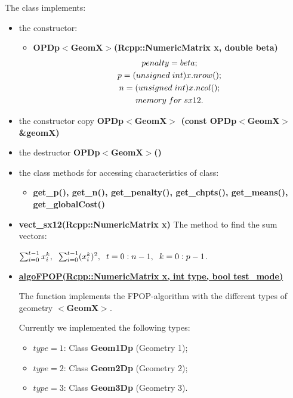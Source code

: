 \documentclass{report}
\begin{document}
	The class implements:
	\begin{itemize}	
		\item the constructor:
		\begin{itemize}
			\item {\bfseries OPDp$<$GeomX$>$(Rcpp::NumericMatrix x, double beta)}
			\begin{equation*}
				\begin{gathered}
					penalty = beta;\\
					p = (unsigned \hspace*{1mm} int)x.nrow();\\
					n = (unsigned \hspace*{1mm} int)x.ncol();\\
					memory\hspace*{1mm} for\hspace*{1mm} sx12.
				\end{gathered}
			\end{equation*}	
		\end{itemize}
		\item the constructor copy {\bfseries OPDp$<$GeomX$>$ (const OPDp$<$GeomX$>$ \&geomX)} 
		\item the destructor {\bfseries OPDp$<$GeomX$>$()}
		\item the class methods for accessing characteristics of class:
		\begin{itemize}
			\item {\bfseries get\_p(),  get\_n(), get\_penalty(), get\_chpts(), get\_means(), get\_globalCost()}		
		\end{itemize}
		\item {\bfseries vect\_sx12(Rcpp::NumericMatrix x)} The method to find the sum vectors:
		
		$\sum_{i=0}^{t-1}x^k_i, \hspace*{2mm}  \sum_{i=0}^{t-1} (x^k_i)^2, \hspace*{2mm} t = 0:n-1, \hspace*{2mm} k = 0:p-1$.	
		\item \hyperref [algoFPOP] {\bfseries algoFPOP(Rcpp::NumericMatrix x, int type, bool test\_mode)} 
			
		The function implements the FPOP-algorithm with the different types of geometry {\bfseries $<$GeomX$>$}.
		
		Currently we implemented the following types:
		\begin{itemize}
			\item $type = 1$: Class {\bfseries  Geom1Dp} (Geometry 1);
			\item $type = 2$: Class {\bfseries  Geom2Dp} (Geometry 2);
			\item $type = 3$: Class {\bfseries  Geom3Dp} (Geometry 3).
		\end{itemize}
	\end{itemize}
\end{document}

